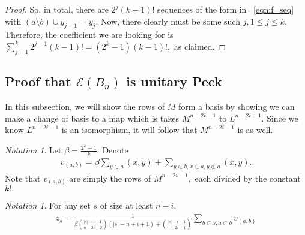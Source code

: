 \documentclass[10 pt]{amsart}
\theoremstyle{plain}
\theoremstyle{definition}
\theoremstyle{remark}
\newtheorem{note}[thm]{Notation}
\numberwithin{equation}{section}
\newcommand\ssec{\subsection}
\begin{document}
\begin{proof}
So, in total, there are $2^j(k-1)!$ sequences of the form in ~\eqref{eqn:f_seq} with $(a\setminus b) \cup y_{j-1} = y_j$. Now, there clearly must be some such $j,1 \leq j \leq k.$ Therefore, the coefficient we are looking for is $\sum_{j = 1}^k 2^{j-1}(k-1)! = (2^k - 1)(k-1)!,$ as claimed.

\end{proof}



\ssec{Proof that $\mathcal E(B_n)$ is unitary Peck}

In this subsection, we will show the rows of $M$ form a basis by showing we can make a change of basis to a map which is takes $M^{n-2i-1}$ to $L^{n-2i-1}.$ Since we know $L^{n-2i-1}$ is an isomorphism, it will follow that $M^{n-2i-1}$ is as well.

\begin{note}

Let $\beta = \frac{2^k-1}{k}.$ Denote 
\begin{align*}
	v_{(a, b)} =\beta \sum_{y \subset a}^{}(x, y) + \sum_{y\subset b,x \subset a,y\not\subset a}^{}(x, y).
\end{align*}
Note that $v_{(a, b)}$ are simply the rows of $M^{n-2i-1},$ each divided by the constant $k!.$
\end{note}

\begin{note}
For any set $s$ of size at least $n-i,$
\begin{align*}
	z_s = \frac{1}{\beta\binom {|s|-i-1}{n-2i-2}(|s|-n+i+1)+\binom{|s|-i-1}{n-2i-1}} \sum_{b\subset s,a \subset b}^{}v_{(a, b)}
\end{align*}
\end{note}
\end{document}
